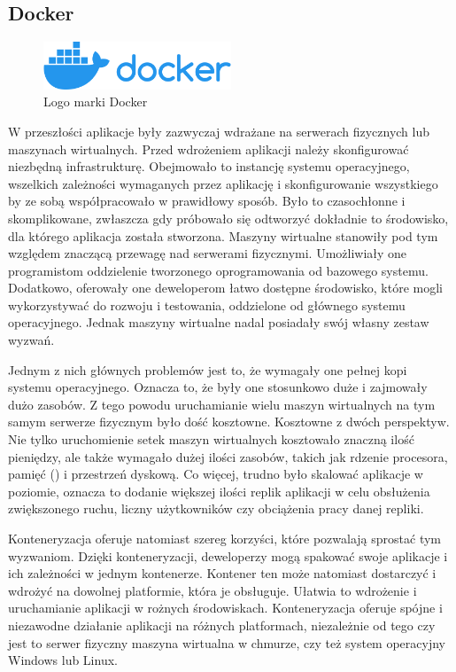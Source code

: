 \subsection{Docker}

\begin{figure}[!htbp]
    \centering
    \includegraphics[width=0.5\textwidth]{images/Docker_logo.png}
    \caption{Logo marki Docker \cite{DockerMedia}}
    \label{fig:enter-label}
\end{figure}

W przeszłości aplikacje były zazwyczaj wdrażane na serwerach fizycznych lub maszynach wirtualnych. Przed wdrożeniem aplikacji należy skonfigurować niezbędną infrastrukturę. Obejmowało to instancję systemu operacyjnego, wszelkich zależności wymaganych przez aplikację i skonfigurowanie wszystkiego by ze sobą współpracowało w prawidłowy sposób. Było to czasochłonne i skomplikowane, zwłaszcza gdy próbowało się odtworzyć dokładnie to środowisko, dla którego aplikacja została stworzona.
Maszyny wirtualne stanowiły pod tym względem znaczącą przewagę nad serwerami fizycznymi. Umożliwiały one programistom oddzielenie tworzonego oprogramowania od bazowego systemu. Dodatkowo, oferowały one deweloperom łatwo dostępne środowisko, które mogli wykorzystywać do rozwoju i testowania, oddzielone od głównego systemu operacyjnego. Jednak maszyny wirtualne nadal posiadały swój własny zestaw wyzwań\cite{dockerContenerizationKeyAndUseCases}. 

Jednym z nich głównych problemów jest to, że wymagały one pełnej kopi systemu operacyjnego. Oznacza to, że były one stosunkowo duże i zajmowały dużo zasobów. Z tego powodu uruchamianie wielu maszyn wirtualnych na tym samym serwerze fizycznym było dość kosztowne. Kosztowne z dwóch perspektyw. Nie tylko uruchomienie setek maszyn wirtualnych kosztowało znaczną ilość pieniędzy, ale także wymagało dużej ilości zasobów, takich jak rdzenie procesora, pamięć  () i przestrzeń dyskową. Co więcej, trudno było skalować aplikacje w poziomie, oznacza to dodanie większej ilości replik aplikacji w celu obsłużenia zwiększonego ruchu, liczny użytkowników czy obciążenia pracy danej repliki\cite{dockerContenerizationKeyAndUseCases}.

Konteneryzacja oferuje natomiast szereg korzyści, które pozwalają sprostać tym wyzwaniom. Dzięki konteneryzacji, deweloperzy mogą spakować swoje aplikacje i ich zależności w jednym kontenerze. Kontener ten może natomiast dostarczyć i wdrożyć na dowolnej platformie, która je obsługuje. Ułatwia to wdrożenie i uruchamianie aplikacji w rożnych środowiskach. Konteneryzacja oferuje spójne i niezawodne działanie aplikacji na różnych platformach, niezależnie od tego czy jest to serwer fizyczny maszyna wirtualna w chmurze, czy też system operacyjny Windows lub Linux\cite{dockerContenerizationKeyAndUseCases}\cite{dockerOverview}. 

